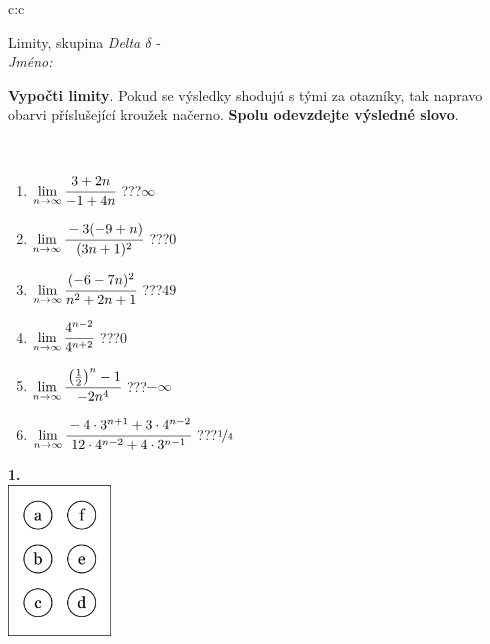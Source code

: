 \documentclass[10pt]{report}
\begin{document}
\begin{tabular}{c:c}
\begin{minipage}[c][104.5mm][t]{0.5\linewidth}
\begin{center}
\vspace{7mm}
{\huge Limity, skupina \textit{Delta $\delta$} -}\\[5mm]
\textit{Jméno:}\phantom{xxxxxxxxxxxxxxxxxxxxxxxxxxxxxxxxxxxxxxxxxxxxxxxxxxxxxxxxxxxxxxxxx}\\[5mm]
\begin{minipage}{0.95\linewidth}
\begin{center}
\textbf{Vypočti limity}. Pokud se výsledky shodujú s tými za otazníky, tak napravo\\obarvi příslušející kroužek načerno. \textbf{Spolu odevzdejte výsledné slovo}.
\end{center}
\end{minipage}
\\[1mm]
\begin{minipage}{0.79\linewidth}
\begin{center}
\begin{varwidth}{\linewidth}
\begin{enumerate}
\normalsize
\item $\lim\limits_{n\to\infty}\cfrac{3+2n}{-1+4n}$\quad \dotfill\; ???\;\dotfill \quad $\infty$
\item $\lim\limits_{n\to\infty}\cfrac{-3(-9+n)}{(3n+1)^2}$\quad \dotfill\; ???\;\dotfill \quad $0$
\item $\lim\limits_{n\to\infty}\cfrac{(-6-7n)^2}{n^2+2n+1}$\quad \dotfill\; ???\;\dotfill \quad $49$
\item $\lim\limits_{n\to\infty}\cfrac{4^{n-2}}{4^{n+2}}$\quad \dotfill\; ???\;\dotfill \quad $0$
\item $\lim\limits_{n\to\infty}\cfrac{\left(\frac{1}{2}\right)^n -1}{-2n^{4}}$\quad \dotfill\; ???\;\dotfill \quad $-\infty$
\item $\lim\limits_{n\to\infty}\cfrac{-4\cdot 3^{n+1}+3\cdot 4^{n-2}}{12\cdot 4^{n-2}+4\cdot 3^{n-1}}$\quad \dotfill\; ???\;\dotfill \quad $\nicefrac{1}{4}$
\end{enumerate}
\end{varwidth}
\end{center}
\end{minipage}
\begin{minipage}{0.20\linewidth}
\begin{center}
{\Huge\bfseries 1.} \\[2mm]
\includegraphics[height=40mm]{../images/braille.png}

\end{center}
\end{minipage}
\end{center}
\end{minipage}
\end{tabular}
\end{document}
